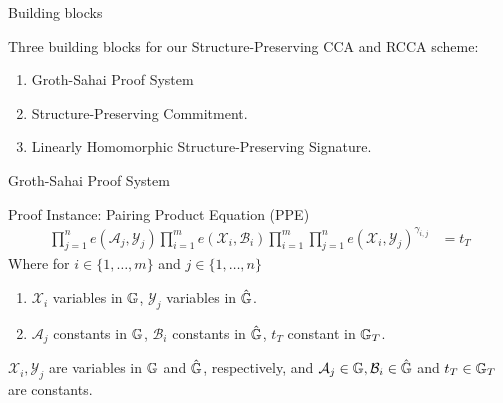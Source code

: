 
\begin{frame}{Building blocks}
  \begin{block}{Three building blocks for our Structure-Preserving CCA and RCCA scheme:}
    \begin{enumerate}
    \item Groth-Sahai Proof System 
    \item Structure-Preserving Commitment.
    \item Linearly Homomorphic Structure-Preserving Signature.
    \end{enumerate}
  \end{block}
\end{frame}


\begin{frame}{Groth-Sahai Proof System}
  \begin{block}{Proof Instance: Pairing Product Equation (PPE)}
    \begin{align*}
      \prod^{n}_{j=1} e(\mathcal{A}_j, \mathcal{Y}_j) \prod^{m}_{i=1}e(\mathcal{X}_i, \mathcal{B}_i)\prod^{m}_{i=1} \prod^{n}_{j=1}e(\mathcal{X}_i, \mathcal{Y}_j)^{\gamma_{i,j}} &= t_T
    \end{align*}
    Where for $i \in \{1, \dots, m\}$ and $j \in \{1, \dots, n\}$
    \begin{enumerate}
    \item $\mathcal{X}_i$ variables in $\mathbb{G}$, $\mathcal{Y}_j$ variables in $\hat{\mathbb{G}}$.
    \item $\mathcal{A}_j$ constants in $\mathbb{G}$, $\mathcal{B}_i$ constants in $\hat{\mathbb{G}}$, $t_T$ constant in $\mathbb{G}_T$.
    \end{enumerate}
    $\mathcal{X}_i, \mathcal{Y}_j$ are variables in $\mathbb{G}$ and $\hat{\mathbb{G}}$, respectively, and $\mathcal{A}_j \in \mathbb{G}, \mathcal{B}_i \in \hat{\mathbb{G}}$ and $t_T \in \mathbb{G}_T$ are constants.
  \end{block}
  
\end{frame}

